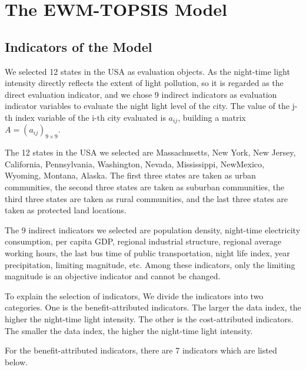 \section{The EWM-TOPSIS Model}

\subsection{Indicators of the Model}
We selected 12 states in the USA as evaluation objects. As the night-time light intensity directly reflects the extent of light pollution, so it is regarded as the direct evaluation indicator, and we chose 9 indirect indicators as evaluation indicator variables to evaluate the night light level of the city. 
The value of the j-th index variable of the i-th city evaluated is $a_{ij}$, building a matrix $A=(a_{ij})_{9\times9}$.

The 12 states in the USA we selected are Massachusetts, New York, New Jersey, California, Pennsylvania, Washington, Nevada, Mississippi, NewMexico, Wyoming, Montana, Alaska. The first three states are taken as urban communities, the second three states are taken as suburban communities, the third three states are taken as rural communities, and the last three states are taken as protected land locations.

The 9 indirect indicators we selected are population density, night-time electricity consumption, per capita GDP, regional industrial structure, regional average working hours, the last bus time of public transportation, night life index, year precipitation, limiting magnitude, etc. Among these indicators, only the limiting magnitude is an objective indicator and cannot be changed.

To explain the selection of indicators, We divide the indicators into two categories. One is the benefit-attributed indicators. The larger the data index, the higher the night-time light intensity. The other is the cost-attributed indicators. The smaller the data index, the higher the night-time light intensity.

For the benefit-attributed indicators, there are 7 indicators which are listed below.

